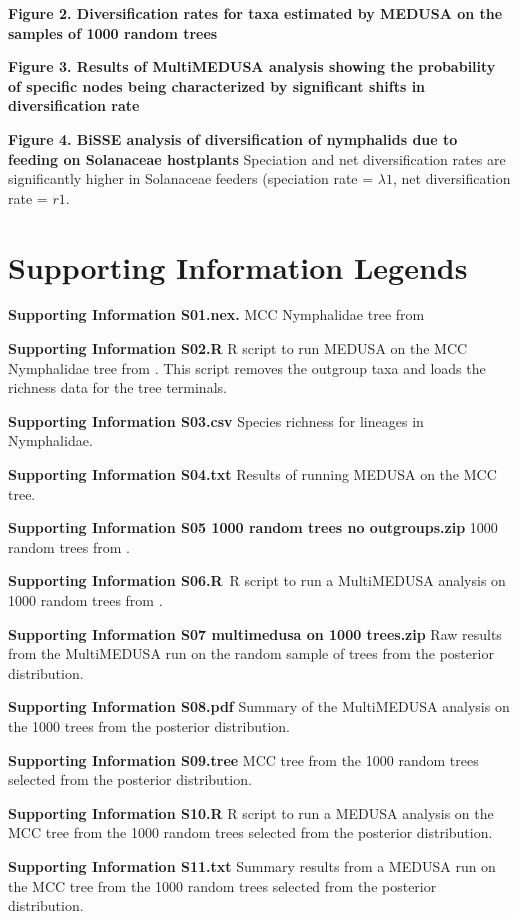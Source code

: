 \documentclass[10pt]{article}
\begin{document}
{\bf Figure 2. Diversification rates for taxa estimated by MEDUSA on
the samples of 1000 random trees}

{\bf Figure 3. Results of MultiMEDUSA analysis showing the
probability of specific nodes being characterized by significant shifts
in diversification rate}

{\bf Figure 4. BiSSE analysis of diversification of nymphalids due
to feeding on Solanaceae hostplants} Speciation and net diversification
rates are significantly higher in Solanaceae feeders (speciation rate =
$\lambda1$, net diversification rate = $r1$.


\section*{Supporting Information Legends}
{\textbf{Supporting Information S01.nex.}} MCC Nymphalidae tree from
\cite{wahlberg2009}

{\textbf{Supporting Information S02.R}} R script to run MEDUSA on the
MCC Nymphalidae tree from \cite{wahlberg2009}. This script removes the outgroup
taxa and loads the richness data for the tree terminals.

{\textbf{Supporting Information S03.csv}} Species richness for lineages
in Nymphalidae.

{\textbf{Supporting Information S04.txt}} Results of running MEDUSA on
the MCC tree.

{\textbf{Supporting Information S05 1000 random trees no outgroups.zip}}
1000 random trees from \cite{wahlberg2009}.

{\textbf{Supporting Information S06.R}}~R script to run a MultiMEDUSA
analysis on 1000 random trees from \cite{wahlberg2009}.

{\textbf{Supporting Information S07 multimedusa on 1000 trees.zip}} Raw
results from the MultiMEDUSA run on the random sample of trees from the
posterior distribution.

{\textbf{Supporting Information S08.pdf}} Summary of the MultiMEDUSA
analysis on the 1000 trees from the posterior distribution.

{\textbf{Supporting Information S09.tree}} MCC tree from the 1000 random
trees selected from the posterior distribution.

{\textbf{Supporting Information S10.R}} R script to run a MEDUSA
analysis on the MCC tree from the 1000 random trees selected from the
posterior distribution.

{\textbf{Supporting Information S11.txt}} Summary results from a MEDUSA
run on the MCC tree from the 1000 random trees selected from the
posterior distribution.
\end{document}
